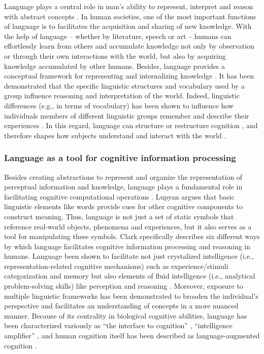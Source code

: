 \documentclass[10pt,journal,compsoc]{IEEEtran}
\begin{document}
	
	Language plays a central role in man’s ability to represent, interpret and reason with abstract concepts \cite{clark2012magic}. In human societies, one of the most important functions of language is to facilitates the acquisition and sharing of new knowledge. With the help of language – whether by literature, speech or art – humans can effortlessly learn from others and accumulate knowledge not only by observation or through their own interactions with the world, but also by acquiring knowledge accumulated by other humans. Besides, language provides a conceptual framework for representing and internalizing knowledge \cite{bourguignon2023emergence}. It has been demonstrated that the specific linguistic structures and vocabulary used by a group influence reasoning and interpretation of the world. Indeed, linguistic differences (e.g., in terms of vocabulary) has been shown to influence how individuals members of different linguistic groups remember and describe their experiences \cite{schmitt1994language,tajima2012linguistic,trueswell2010perceiving,feist2013remembering}. In this regard, language can structure or restructure cognition \cite{majid2004can}, and therefore shapes how subjects understand and interact with the world \cite{duranti2011linguistic,lupyan2016centrality}.
	
	
	
	\subsubsection{Language as a tool for cognitive information processing} 
	
	Besides creating abstractions to represent and organize the representation of perceptual information and knowledge, language plays a fundamental role in facilitating cognitive computational operations \cite{clark2012magic}. Lupyan \cite{lupyan2016centrality} argues that basic linguistic elements like words provide cues for other cognitive components to construct meaning. Thus, language is not just a set of static symbols that reference real-world objects, phenomena and experiences, but it also serves as a tool for manipulating these symbols. Clark \cite{clark2012magic} specifically describes six different ways by which language facilitates cognitive information processing and reasoning in humans. Language been shown to facilitate not just crystalized intelligence (i.e., representation-related cognitive mechanisms) such as experience/stimuli categorization \cite{tajima2012linguistic} and memory \cite{schmitt1994language,feist2013remembering} but also elements of fluid intelligence (i.e., analytical problem-solving skills) like perception \cite{thierry2009unconscious,lupyan2008perceptual,meteyard2007motion} and reasoning \cite{clark2012magic,lupyan2016centrality}. Moreover, exposure to multiple linguistic frameworks has been demonstrated to broaden the individual’s perspective and facilitates an understanding of concepts in a more nuanced manner. Because of its centrality in biological cognitive abilities, language has been characterized variously as “the interface to cognition” \cite{novack2020becoming}, “intelligence amplifier” \cite{roth2012evolution}, and human cognition itself has been described as language-augmented cognition \cite{lupyan2016centrality}. 
	
\end{document}
